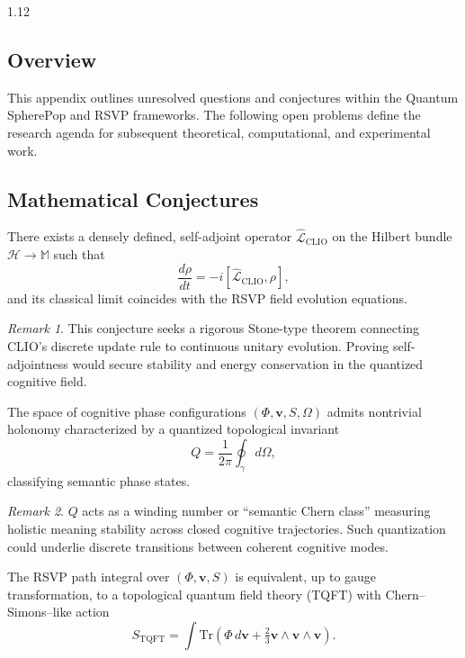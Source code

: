 \documentclass[12pt,a4paper]{article}
\numberwithin{equation}{section}
\theoremstyle{remark}
\newtheorem{remark}{Remark}[section]
\theoremstyle{definition}
\begin{document}
\begin{spacing}{1.12}
\subsection{Overview}\label{sec:I-overview}
This appendix outlines unresolved questions and conjectures within the Quantum SpherePop and RSVP frameworks.  
The following open problems define the research agenda for subsequent theoretical, computational, and experimental work.

\subsection{Mathematical Conjectures}\label{sec:I-math}

\begin{conjecture}\label{conj:I-clio}
There exists a densely defined, self-adjoint operator $\hat{\mathcal{L}}_{\mathrm{CLIO}}$ on the Hilbert bundle $\mathcal{H}\to\mathbb{M}$ such that
\[
\frac{d\rho}{dt} = -i[\hat{\mathcal{L}}_{\mathrm{CLIO}}, \rho],
\]
and its classical limit coincides with the RSVP field evolution equations.
\end{conjecture}

\begin{remark}
This conjecture seeks a rigorous Stone-type theorem connecting CLIO’s discrete update rule to continuous unitary evolution.  
Proving self-adjointness would secure stability and energy conservation in the quantized cognitive field.
\end{remark}

\begin{conjecture}\label{conj:I-holonomy}
The space of cognitive phase configurations $(\Phi,\mathbf{v},S,\Omega)$ admits nontrivial holonomy characterized by a quantized topological invariant
\[
Q = \frac{1}{2\pi}\oint_\gamma d\Omega,
\]
classifying semantic phase states.
\end{conjecture}

\begin{remark}
$Q$ acts as a winding number or “semantic Chern class” measuring holistic meaning stability across closed cognitive trajectories.  
Such quantization could underlie discrete transitions between coherent cognitive modes.
\end{remark}

\begin{conjecture}\label{conj:I-tqft}
The RSVP path integral over $(\Phi,\mathbf{v},S)$ is equivalent, up to gauge transformation, to a topological quantum field theory (TQFT) with Chern–Simons–like action
\[
S_{\mathrm{TQFT}} = \int \mathrm{Tr}\!\left(\Phi\,d\mathbf{v} + \tfrac{2}{3}\mathbf{v}\wedge\mathbf{v}\wedge\mathbf{v}\right).
\]
\end{conjecture}


\end{spacing}
\end{document}
